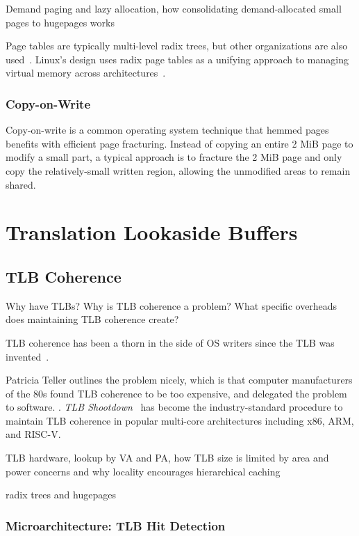 Demand paging and lazy allocation, how consolidating demand-allocated small pages to hugepages works

Page tables are typically multi-level radix trees, but other organizations are also used~\cite{jacob_look_1998}. Linux's design uses radix page tables as a unifying approach to managing virtual memory across architectures~\cite{torvalds_linux_1997}.

\subsubsection{Copy-on-Write}
Copy-on-write is a common operating system technique that hemmed pages benefits with efficient page fracturing. Instead of copying an entire 2 MiB page to modify a small part, a typical approach is to fracture the 2 MiB page and only copy the relatively-small written region, allowing the unmodified areas to remain shared.

\section{Translation Lookaside Buffers}

\subsection{TLB Coherence}

Why have TLBs? Why is TLB coherence a problem? What specific overheads does maintaining TLB coherence create?

TLB coherence has been a thorn in the side of OS writers since the TLB was invented~\cite{kilburn_one_1962}.

Patricia Teller outlines the problem nicely, which is that computer manufacturers of the 80s found TLB coherence to be too expensive, and delegated the problem to software. \cite{teller_cost_1990}. \textit{TLB Shootdown}~\cite{black_translation_1989} has become the industry-standard procedure to maintain TLB coherence in popular multi-core architectures including x86, ARM, and RISC-V.

TLB hardware, lookup by VA and PA, how TLB size is limited by area and power concerns and why locality encourages hierarchical caching

radix trees and hugepages

\subsubsection{Microarchitecture: TLB Hit Detection}

